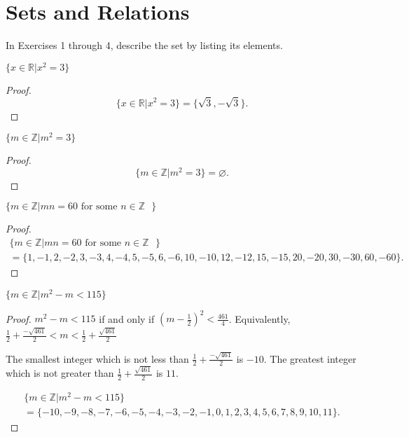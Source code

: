 \section{Sets and Relations}

In Exercises 1 through 4, describe the set by listing its elements.

\begin{exercise}
    $\{ x\in\mathbb{R} \vert x^{2} = 3 \}$
\end{exercise}

\begin{proof}
    \[
        \{ x\in\mathbb{R} \vert x^{2} = 3 \} = \{ \sqrt{3}, -\sqrt{3} \}.
    \]
\end{proof}

\begin{exercise}
    $\{ m\in\mathbb{Z} \vert m^{2} = 3 \}$
\end{exercise}

\begin{proof}
    \[
        \{ m\in\mathbb{Z} \vert m^{2} = 3 \} = \varnothing.
    \]
\end{proof}

\begin{exercise}
    $\{ m\in\mathbb{Z} \vert mn = 60 \text{ for some $n\in\mathbb{Z}$ } \}$
\end{exercise}

\begin{proof}
    \begin{multline*}
        \{ m\in\mathbb{Z} \vert mn = 60 \text{\ for some $n\in\mathbb{Z}$ } \} \\
        = \{ 1, -1, 2, -2, 3, -3, 4, -4, 5, -5, 6, -6, 10, -10, 12, -12, 15, -15, 20, -20, 30, -30, 60, -60 \}.
    \end{multline*}
\end{proof}

\begin{exercise}
    $\{ m\in\mathbb{Z} \vert m^{2} - m < 115 \}$
\end{exercise}

\begin{proof}
    $m^{2} - m < 115$ if and only if ${\left(m - \frac{1}{2}\right)}^{2} < \frac{461}{4}$. Equivalently, $\frac{1}{2} + \frac{-\sqrt{461}}{2} < m < \frac{1}{2} + \frac{\sqrt{461}}{2}$

    The smallest integer which is not less than $\frac{1}{2} + \frac{-\sqrt{461}}{2}$ is $-10$. The greatest integer which is not greater than $\frac{1}{2} + \frac{\sqrt{461}}{2}$ is $11$.

    \begin{multline*}
        \{ m\in\mathbb{Z} \vert m^{2} - m < 115 \} \\
        = \{ -10, -9, -8, -7, -6, -5, -4, -3, -2, -1, 0, 1, 2, 3, 4, 5, 6, 7, 8, 9, 10, 11 \}.
    \end{multline*}
\end{proof}

